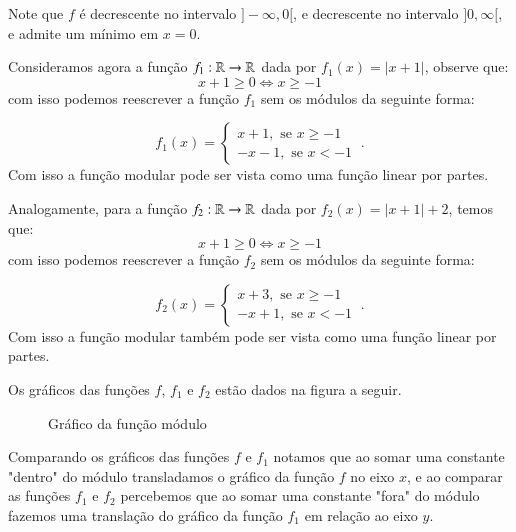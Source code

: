   Note que $f$ é decrescente no intervalo $]-\infty, 0[$, e decrescente no intervalo $]0, \infty[$, e admite um mínimo em $x=0$.
  
  Consideramos agora a função $f_1: \mathbb{R} \rightarrow \mathbb{R}$ dada por $f_1(x)= |x+1|$, observe que:
  \[x+1 \geq 0 \Leftrightarrow  x \geq -1\]
  com isso podemos reescrever a função $f_1$ sem os módulos da seguinte forma:
  
  \[f_1(x)= \begin{cases}
                 x + 1, \text{ se } x \geq -1 \\
                 -x - 1, \text{ se } x < -1
                \end{cases} \ .\]
  Com isso a função modular pode ser vista como uma função linear por partes.
  
  Analogamente, para a função $f_2: \mathbb{R} \rightarrow \mathbb{R}$ dada por $f_2(x)= |x+1|+2$, temos que:
  \[x+1 \geq 0 \Leftrightarrow  x \geq -1\]
  com isso podemos reescrever a função $f_2$ sem os módulos da seguinte forma:
  
  \[f_2(x)= \begin{cases}
                 x + 3, \text{ se } x \geq -1 \\
                 -x + 1, \text{ se } x < -1
                \end{cases} \ .\]
  Com isso a função modular também pode ser vista como uma função linear por partes.
  
  Os gráficos das funções $f$, $f_1$ e $f_2$ estão dados na figura a seguir.  
  
  \begin{figure}[H]
 \centering
    \caption{Gráfico da função módulo}
  \end{figure}
  
  Comparando os gráficos das funções $f$ e $f_1$ notamos que ao somar uma constante "dentro" do módulo transladamos o gráfico da função $f$ no eixo $x$, e ao comparar as funções $f_1$ e $f_2$ percebemos que ao somar uma constante "fora" do módulo fazemos uma translação do gráfico da função $f_1$ em relação ao eixo $y$.
  
